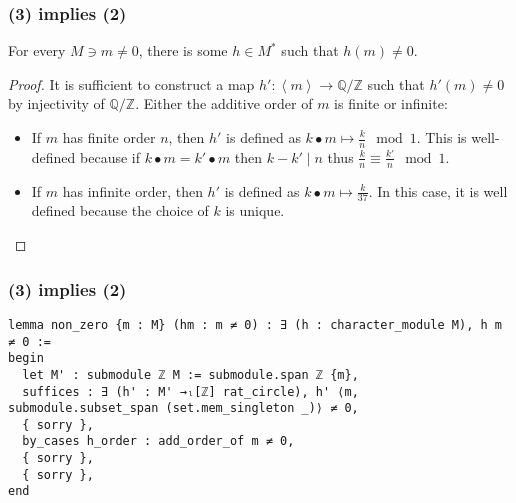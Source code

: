 \documentclass[aspectratio=169]{beamer}
\begin{document}
\begin{frame}[fragile]
\frametitle{(3) implies (2)}
\begin{minipage}{0.1\textwidth}
\end{minipage}%
\begin{minipage}{0.9\textwidth}
\begin{theorem}
For every $M \ni m \ne 0$, there is some $h \in M^*$ such that $h(m)\ne 0$.
\end{theorem}
\begin{proof}
It is sufficient to construct a map $h' : \left\langle m\right\rangle \to 
\mathbb{Q}/\mathbb{Z}$ such that $h'(m)\ne 0$ by injectivity of $\mathbb{Q}/\mathbb{Z}$.
Either the additive order of $m$ is finite or infinite:
\begin{itemize}
\item If $m$ has finite order $n$, then $h'$ is defined as $k\bullet m \mapsto \frac{k}{n} \mod 1$.
This is well-defined because if $k\bullet m = k'\bullet m$ then $k - k'\mid n$ thus $\frac{k}{n}\equiv \frac{k'}{n}\mod 1$.
\item If $m$ has infinite order, then $h'$ is defined as $k\bullet m \mapsto \frac{k}{37}$. In this
case, it is well defined because the choice of $k$ is unique.
\end{itemize}
\end{proof}

\end{minipage}%

\end{frame}







\begin{frame}[fragile]
\frametitle{(3) implies (2)}
\begin{minipage}{0.1\textwidth}
\end{minipage}%
\begin{minipage}{0.9\textwidth}
\begin{lstlisting}
lemma non_zero {m : M} (hm : m ≠ 0) : ∃ (h : character_module M), h m ≠ 0 :=
begin 
  let M' : submodule ℤ M := submodule.span ℤ {m},
  suffices : ∃ (h' : M' →ₗ[ℤ] rat_circle), h' ⟨m, submodule.subset_span (set.mem_singleton _)⟩ ≠ 0,
  { sorry },
  by_cases h_order : add_order_of m ≠ 0,
  { sorry },
  { sorry },
end
\end{lstlisting}
\end{minipage}%

\end{frame}
\end{document}
